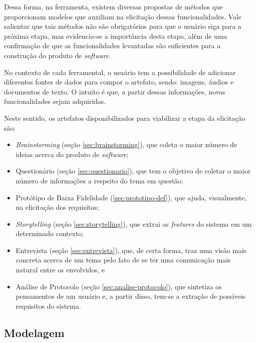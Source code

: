 Dessa forma, na ferramenta, existem diversas propostas de métodos que proporcionam modelos que auxiliam na elicitação dessas funcionalidades. Vale salientar que tais métodos não são obrigatórios para que o usuário siga para a próxima etapa, mas evidencia-se a importância desta etapa, além de uma confirmação de que as funcionalidades levantadas são suficientes para a construção do produto de \textit{software}.

No contexto de cada ferramental, o usuário tem a possibilidade de adicionar diferentes fontes de dados para compor o artefato, sendo: imagens, áudios e documentos de texto. O intuito é que, a partir dessas informações, novas funcionalidades sejam adquiridas.



Neste sentido, os artefatos disponibilizados para viabilizar a etapa da elicitação são:

\begin{itemize}
    \item \textit{Brainstorming} (seção \ref{sec:brainstorming}), que coleta o maior número de ideias acerca do produto de \textit{software};
    \item Questionário (seção \ref{sec:questionario}), que tem o objetivo de coletar o maior número de informações a respeito do tema em questão;
    \item Protótipo de Baixa Fidelidade (\ref{sec:prototipo-def}), que ajuda, visualmente, na elicitação dos requisitos;
    \item \textit{Storytelling} (seção \ref{sec:storytelling}), que extrai as \textit{features} do sistema em um determinado contexto;
    \item Entrevista (seção \ref{sec:entrevista}), que, de certa forma, traz uma visão mais concreta acerca de um tema pelo fato de se ter uma comunicação mais natural entre os envolvidos, e
    \item Análise de Protocolo (seção \ref{sec:analise-protocolo}), que sintetiza os pensamentos de um usuário e, a partir disso, tem-se a extração de possíveis requisitos do sistema.
\end{itemize}

\subsection{Modelagem}

